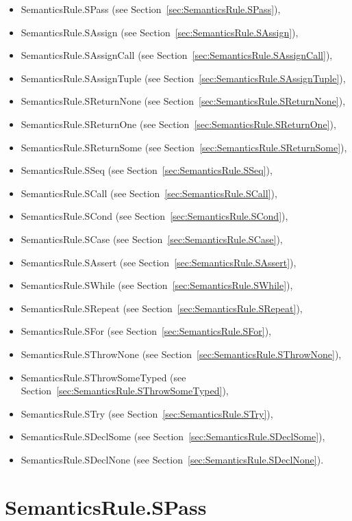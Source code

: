 \documentclass{book}
\begin{document}
\begin{itemize}
\item SemanticsRule.SPass (see Section~\ref{sec:SemanticsRule.SPass}),
\item SemanticsRule.SAssign (see Section~\ref{sec:SemanticsRule.SAssign}),
\item SemanticsRule.SAssignCall (see Section~\ref{sec:SemanticsRule.SAssignCall}),
\item SemanticsRule.SAssignTuple (see Section~\ref{sec:SemanticsRule.SAssignTuple}),
\item SemanticsRule.SReturnNone (see Section~\ref{sec:SemanticsRule.SReturnNone}),
\item SemanticsRule.SReturnOne (see Section~\ref{sec:SemanticsRule.SReturnOne}),
\item SemanticsRule.SReturnSome (see Section~\ref{sec:SemanticsRule.SReturnSome}),
\item SemanticsRule.SSeq (see Section~\ref{sec:SemanticsRule.SSeq}),
\item SemanticsRule.SCall (see Section~\ref{sec:SemanticsRule.SCall}),
\item SemanticsRule.SCond (see Section~\ref{sec:SemanticsRule.SCond}),
\item SemanticsRule.SCase (see Section~\ref{sec:SemanticsRule.SCase}),
\item SemanticsRule.SAssert (see Section~\ref{sec:SemanticsRule.SAssert}),
\item SemanticsRule.SWhile (see Section~\ref{sec:SemanticsRule.SWhile}),
\item SemanticsRule.SRepeat (see Section~\ref{sec:SemanticsRule.SRepeat}),
\item SemanticsRule.SFor (see Section~\ref{sec:SemanticsRule.SFor}),
\item SemanticsRule.SThrowNone (see Section~\ref{sec:SemanticsRule.SThrowNone}),
\item SemanticsRule.SThrowSomeTyped (see Section~\ref{sec:SemanticsRule.SThrowSomeTyped}),
\item SemanticsRule.STry (see Section~\ref{sec:SemanticsRule.STry}),
\item SemanticsRule.SDeclSome (see Section~\ref{sec:SemanticsRule.SDeclSome}),
\item SemanticsRule.SDeclNone (see Section~\ref{sec:SemanticsRule.SDeclNone}).
\end{itemize}

\section{SemanticsRule.SPass \label{sec:SemanticsRule.SPass}}
\end{document}
